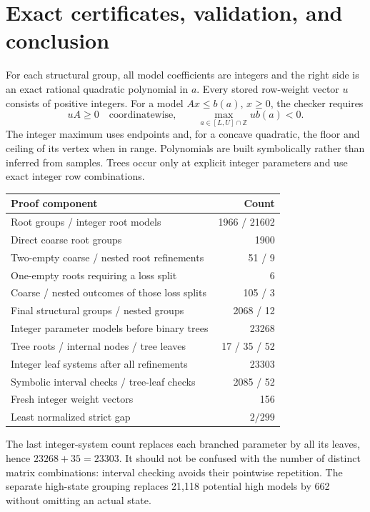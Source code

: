 \documentclass[11pt,a4paper]{article}
\begin{document}
\section{Exact certificates, validation, and conclusion}
For each structural group, all model coefficients are integers and the
right side is an exact rational quadratic polynomial in $a$.
Every stored row-weight vector $u$ consists of positive integers.
For a model $Ax\le b(a)$, $x\ge0$, the checker requires
\[
 uA\ge0\quad\text{coordinatewise},\qquad
 \max_{a\in[L,U]\cap\mathbb Z}ub(a)<0.
\]
The integer maximum uses endpoints and, for a concave quadratic, the
floor and ceiling of its vertex when in range. Polynomials are built
symbolically rather than inferred from samples. Trees occur only at
explicit integer parameters and use exact integer row combinations.

\begin{center}\small
\begin{tabular}{lr}
\toprule
Proof component&Count\\
\midrule
Root groups / integer root models&1966 / 21602\\
Direct coarse root groups&1900\\
Two-empty coarse / nested root refinements&51 / 9\\
One-empty roots requiring a loss split&6\\
Coarse / nested outcomes of those loss splits&105 / 3\\
Final structural groups / nested groups&2068 / 12\\
Integer parameter models before binary trees&23268\\
Tree roots / internal nodes / tree leaves&17 / 35 / 52\\
Integer leaf systems after all refinements&23303\\
Symbolic interval checks / tree-leaf checks&2085 / 52\\
Fresh integer weight vectors&156\\
Least normalized strict gap&$2/299$\\
\bottomrule
\end{tabular}
\end{center}
The last integer-system count replaces each branched parameter by all
its leaves, hence $23268+35=23303$. It should not be confused with the
number of distinct matrix combinations: interval checking avoids their
pointwise repetition. The separate high-state grouping replaces 21,118
potential high models by 662 without omitting an actual state.
\end{document}
